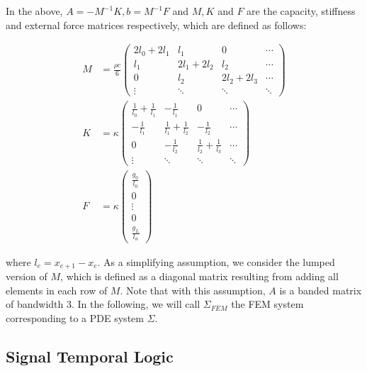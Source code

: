 \documentclass[oribibl]{llncs/llncs}
\begin{document}
In the above, $A = -M^{-1}K, b = M^{-1} F$ and $M, K$ and $F$ are the capacity,
stiffness and external force matrices respectively, which are defined as
follows:

    \begin{align}
        M &= \frac{\rho c}{6} \begin{pmatrix}
            2 l_0 + 2 l_1 & l_1  & 0 & \cdots \\ 
            l_1 & 2 l_1 + 2 l_2 & l_2  & \cdots \\ 
            0 & l_2 & 2 l_2 + 2 l_3 &  \cdots \\ 
            \vdots & \ddots & \ddots & \ddots 
        \end{pmatrix} \label{eq:matrices_M} \\
        K &= \kappa \begin{pmatrix}
            \frac{1}{l_0} + \frac{1}{l_1} & -\frac{1}{l_1}  & 0 & \cdots \\ 
            -\frac{1}{l_1} & \frac{1}{l_1} + \frac{1}{l_2} & -\frac{1}{l_2}  & \cdots \\ 
            0 & -\frac{1}{l_2} & \frac{1}{l_2} + \frac{1}{l_3} &  \cdots \\ 
            \vdots & \ddots & \ddots & \ddots 
        \end{pmatrix} \label{eq:matrices_K}\\
        F &= \kappa \begin{pmatrix}
            \frac{g_0}{l_0} \\
            0 \\
            \vdots \\
            0 \\
            \frac{g_L}{l_n}
        \end{pmatrix} \label{eq:matrices_F}
    \end{align}

where $l_e = x_{e+1} - x_e$. As a simplifying assumption, we consider the lumped version of $M$, which is
defined as a diagonal matrix resulting from adding all elements in each row of
$M$. Note that with this assumption, $A$ is a banded matrix of bandwidth 3. 
In the following, we will call $\Sigma_{FEM}$ the FEM system corresponding to a
PDE system $\Sigma$.

\subsection{Signal Temporal Logic}
\label{sec:signal_temporal_logic}
\end{document}
